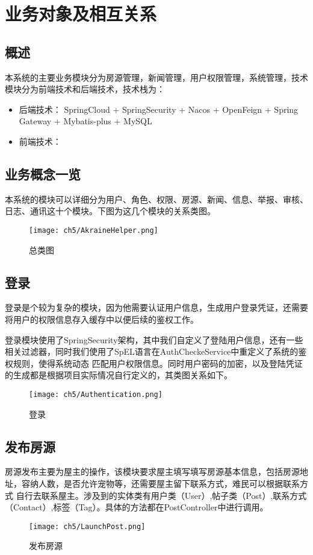 \chapter{业务对象及相互关系}
\section{概述}
本系统的主要业务模块分为房源管理，新闻管理，用户权限管理，系统管理，技术模块分为前端技术和后端技术，技术栈为：
\begin{itemize}
    \item 后端技术： SpringCloud + SpringSecurity + Nacos + OpenFeign + Spring Gateway + Mybatis-plus + MySQL
    \item 前端技术： 
\end{itemize}
\section{业务概念一览}
本系统的模块可以详细分为用户、角色、权限、房源、新闻、信息、举报、审核、日志、通讯这十个模块。下图为这几个模块的关系类图。
\begin{figure}[htbp]
    \centering
    \texttt{[image: ch5/AkraineHelper.png]}
    \caption{总类图}\label{fig:AkraineHelper}
    \vspace{\baselineskip} %
\end{figure}
\section{登录}
登录是个较为复杂的模块，因为他需要认证用户信息，生成用户登录凭证，还需要将用户的权限信息存入缓存中以便后续的鉴权工作。

登录模块使用了SpringSecurity架构，其中我们自定义了登陆用户信息，还有一些相关过滤器，同时我们使用了SpEL语言在AuthCheckeService中重定义了系统的鉴权规则，使得系统动态
匹配用户权限信息。同时用户密码的加密，以及登陆凭证的生成都是根据项目实际情况自行定义的，其类图关系如下。
\begin{figure}[htbp]
    \centering
    \texttt{[image: ch5/Authentication.png]}
    \caption{登录}\label{fig:Authentication}
    \vspace{\baselineskip} %
\end{figure}
\section{发布房源}
房源发布主要为屋主的操作，该模块要求屋主填写填写房源基本信息，包括房源地址，容纳人数，是否允许宠物等，还需要屋主留下联系方式，难民可以根据联系方式
自行去联系屋主。涉及到的实体类有用户类（User）,帖子类（Post）,联系方式（Contact）,标签（Tag）。具体的方法都在PostController中进行调用。
\begin{figure}[htbp]
    \centering
    \texttt{[image: ch5/LaunchPost.png]}
    \caption{发布房源}\label{fig:LaunchPost}
    \vspace{\baselineskip} %
\end{figure}
